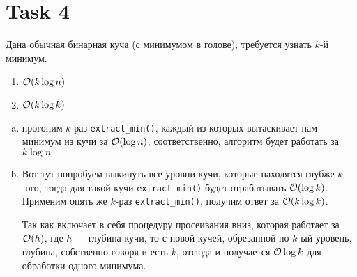 \section{Task 4}
\begin{task}
    Дана обычная бинарная куча (с минимумом в голове), требуется
    узнать $k$-й минимум.
    \begin{enumerate}
      \item $\mathcal{O}(k\log n)$
      \item $\mathcal{O}(k\log k)$
    \end{enumerate}
\end{task}

\begin{solution}
    \begin{enumerate}[a)]
        \item прогоним $k$ раз \texttt{extract\_min()}, каждый из которых вытаскивает нам минимум из кучи за $\mathcal{O}(\log n)$, соответственно, алгоритм будет работать за $k\log n$
        \item Вот тут попробуем выкинуть все уровни кучи, которые находятся глубже $k$-ого, тогда для такой кучи \texttt{extract\_min()} будет отрабатывать $\mathcal{O}(\log k)$. Применим опять же $k$-раз \texttt{extract\_min()}, получим ответ за $\mathcal{O}(k\log k)$.
        
        \begin{remark}
            Так как  включает в себя процедуру просеивания вниз, которая работает за $\mathcal{O}(h)$, где $h$ --- глубина кучи, то с новой кучей, обрезанной по $k$-ый уровень, глубина, собственно говоря и есть $k$, отсюда и получается $\mathcal{O}\log k$ для обработки одного минимума.
        \end{remark}
    \end{enumerate}
\end{solution}